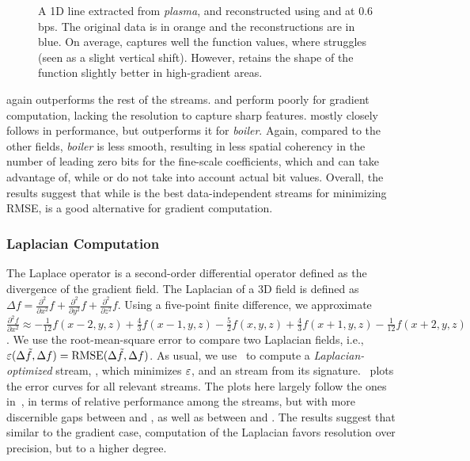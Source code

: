 \begin{figure}[!b]
\centering
{}
 \caption{A 1D
line extracted from \emph{plasma}, and reconstructed using \sbit and \swav at 0.6 bps. The original
data is in orange and the reconstructions are in blue. On average, \swav captures well the function
values, where \sbit struggles (seen as a slight vertical shift). However, \sbit retains the shape of
the function slightly better in high-gradient areas.}
\label{fig:bit-plane-vs-wavelet-norm-gradient}
\vspace{-1em}
\end{figure}

\sgop again outperforms the rest of the streams. \slvl and \smag perform poorly for gradient
computation, lacking the resolution to capture sharp features. \sgsg mostly closely follows \sbit in
performance, but outperforms it for \emph{boiler}. Again, compared to the other fields,
\emph{boiler} is less smooth, resulting in less spatial coherency in the number of leading zero bits
for the fine-scale coefficients, which \sgop and \sgsg can take advantage of, while \swav or \sbit
do not take into account actual bit values. Overall, the results suggest that while \swav is the
best data-independent streams for minimizing RMSE, \sbit is a good alternative for gradient
computation.

\subsubsection{Laplacian Computation}\label{sec:laplacian}

The Laplace operator is a second-order differential operator defined as the divergence of the
gradient field. The Laplacian of a 3D field is defined as $\Delta f = 
\frac{{\partial}^2}{\partial{x^2}}f+\frac{{\partial}^2}{\partial{y^2}}f+\frac{{\partial}^2}{\partial{z^2}}f$.
%
Using a five-point finite difference, we approximate 
$\frac{{\partial}^2 f}{\partial{x^2}}
\approx
-\frac{1}{12}f(x-2,y,z)+\frac{4}{3}f(x-1,y,z)-\frac{5}{2}f(x,y,z)+\frac{4}{3}f(x+1,y,z)-\frac{1}{12}f(x+2,y,z)$.
We use the root-mean-square error to compare two Laplacian fields, i.e., $\err(\Delta
\tilde{f},\Delta f)=\text{RMSE}(\Delta \tilde{f},\Delta f)$. As usual, we use~ to
compute a \emph{Laplacian-optimized} stream, \slop, which minimizes $\err$, and an \slsg stream from
its signature.~ plots the error curves for all relevant
streams. The plots here largely follow the ones in~, in terms of
relative performance among the streams, but with more discernible gaps between \sbit and \slsg, as
well as between \slsg and \sbit. The results suggest that similar to the gradient case, computation
of the Laplacian favors resolution over precision, but to a higher degree.
